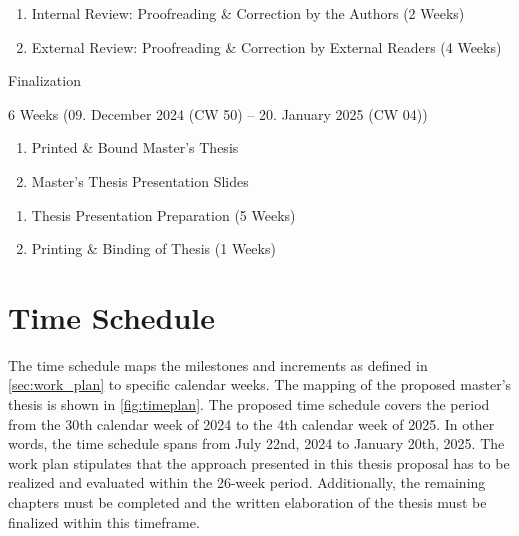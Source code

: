 \begin{description}
\begin{description}[style=multiline, leftmargin=\widthof{\textbf{Deliverables:}}]
        \item[Increments:]
        \begin{enumerate}[label=\arabic*), leftmargin=\widthof{a)}+\labelsep]
            \item Internal Review: Proofreading \& Correction by the Authors (2 Weeks)
            \item External Review: Proofreading \& Correction by External Readers (4 Weeks)
        \end{enumerate}
    \end{description}
    \item[Milestone VI:] Finalization
    \begin{description}[style=multiline, leftmargin=\widthof{\textbf{Deliverables:}}]
        \item[Duration:] 6 Weeks (09. December 2024 (CW 50) -- 20. January 2025 (CW 04))
        \item[Deliverables:]
        \begin{enumerate}[label=\alph*), leftmargin=\widthof{a)}+\labelsep]
            \item Printed \& Bound Master's Thesis
            \item Master's Thesis Presentation Slides
        \end{enumerate}
        \item[Increments:]
        \begin{enumerate}[label=\arabic*), leftmargin=\widthof{a)}+\labelsep]
            \item Thesis Presentation Preparation (5 Weeks)
            \item Printing \& Binding of Thesis (1 Weeks)
        \end{enumerate}
    \end{description}
\end{description}

\section{Time Schedule}
\label{sec:time_schedule}
The time schedule maps the milestones and increments as defined in \autoref{sec:work_plan} to specific calendar weeks.
The mapping of the proposed master's thesis is shown in \autoref{fig:timeplan}.
The proposed time schedule covers the period from the 30th calendar week of 2024 to the 4th calendar week of 2025.
In other words, the time schedule spans from July 22nd, 2024 to January 20th, 2025.
The work plan stipulates that the approach presented in this thesis proposal has to be realized and evaluated within the 26-week period.
Additionally, the remaining chapters must be completed and the written elaboration of the thesis must be finalized within this timeframe.

